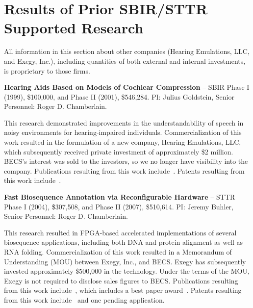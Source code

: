 \section{Results of Prior SBIR/STTR Supported Research}
\label{sec:prior}

All information in this section
about other companies (Hearing Emulations, LLC, and
Exegy, Inc.), including quantities of both external and internal investments,
is proprietary to those firms.

\medskip

\noindent
{\bf Hearing Aids Based on Models of Cochlear Compression} --
SBIR Phase I (1999), \$100,000, and Phase II (2001), \$546,284.
PI: Julius Goldstein, Senior Personnel: Roger D. Chamberlain.

This research demonstrated improvements in the understandability of speech in
noisy environments for hearing-impaired individuals.
Commercialization of this work resulted in the formulation of a new
company, Hearing Emulations, LLC, which subsequently received private
investment of approximately \$2 million.
BECS's interest was sold to the investors, so we no longer
have visibility into the company.
Publications resulting from this work
include~\cite{cgi03,gogv03,gvc01,gvcgi00}.
Patents resulting from this work
include~\cite{Goldstein05a,Goldstein05b,gc03}.

\medskip

\noindent
{\bf Fast Biosequence Annotation via Reconfigurable Hardware} --
STTR Phase I (2004), \$307,508, and Phase II (2007), \$510,614.
PI: Jeremy Buhler, Senior Personnel: Roger D. Chamberlain.

This research resulted in FPGA-based accelerated implementations of
several biosequence applications, including both DNA and protein alignment
as well as RNA folding.
Commercialization of this work resulted in a Memorandum of Understanding (MOU)
between Exegy, Inc., and BECS.  Exegy has subsequently invested
approximately \$500,000 in the technology.
Under the terms of the MOU, Exegy
is not required to disclose sales figures to BECS.
Publications resulting from this work
include~\cite{bljc07,dlmbc10,hjlbc07,jbc08,jlbc07b,jlbc07a,jlbhc08,jbc09,jbc10b,jbc10a,kbcfgl04,kbcfgjl07,lbc05,lbc09},
which includes a best paper award~\cite{jbc10b}.
Patents resulting from this work
include~\cite{Buhler11,Buhler13,Buhler17} and one pending application.
